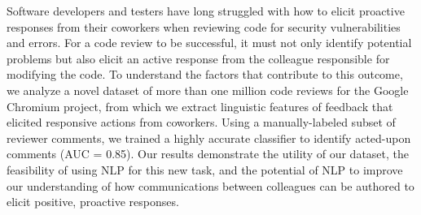Software developers and testers have long struggled with how to elicit proactive responses from their coworkers when reviewing code for security vulnerabilities and errors. For a code review to be successful, it must not only identify potential problems but also elicit an active response from the colleague responsible for modifying the code. To understand the factors that contribute to this outcome, we analyze a novel dataset of more than one million code reviews for the Google Chromium project, from which we extract linguistic features of feedback that elicited responsive actions from coworkers. Using a manually-labeled subset of reviewer comments, we trained a highly accurate classifier to identify acted-upon comments (AUC = 0.85). Our results demonstrate the utility of our dataset, the feasibility of using NLP for this new task, and the potential of NLP to improve our understanding of how communications between colleagues can be authored to elicit positive, proactive responses.
